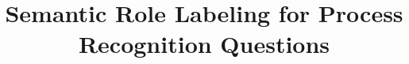 \documentclass[11pt,a4paper]{article}
\title{Semantic Role Labeling for Process Recognition Questions}
\date{}
\begin{document}
\maketitle








\begin{small}

\end{small}
\end{document}
